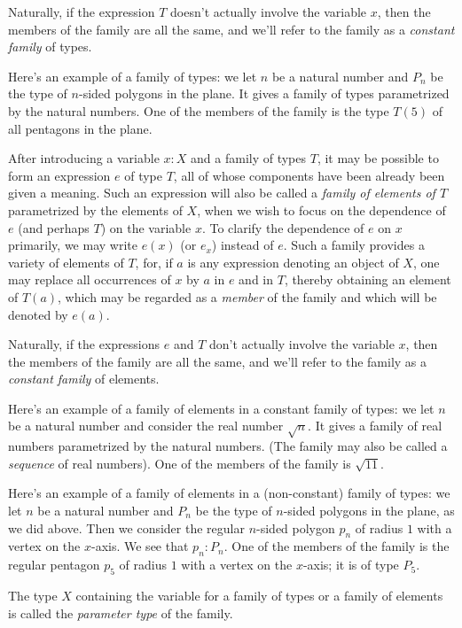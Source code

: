 Naturally, if the expression $T$ doesn't actually involve the variable $x$, then the members of the family are all the same,
and we'll refer to the family as a \emph{constant family} of types.

Here's an example of a family of types: we let $n$ be a natural number and $P_n$ be the type of $n$-sided polygons in the plane.  It gives a family
of types parametrized by the natural numbers.  One of the members of the family is the type $T(5)$ of all pentagons in the plane.

After introducing a variable $x:X$ and a family of types $T$, it may be possible to form an expression $e$ of type $T$, all of whose components have been already been
given a meaning.
Such an expression will also be called a \emph{family of elements of $T$}  parametrized by the elements of $X$, when
we wish to focus on the dependence of $e$ (and perhaps $T$) on the variable $x$.
To clarify the dependence of $e$ on $x$ primarily, we may write $e(x)$ (or $e_x$) instead of $e$.
Such a family provides a variety of elements of $T$, for, if $a$ is any expression denoting an object of $X$, one may replace all
occurrences of $x$ by $a$ in $e$ and in $T$, thereby obtaining an element of $T(a)$, which may be regarded as a \emph{member} of the family
and which will be denoted by $e(a)$.

Naturally, if the expressions $e$ and $T$ don't actually involve the variable $x$, then the members of the family are all the same,
and we'll refer to the family as a \emph{constant family} of elements.

Here's an example of a family of elements in a constant family of types: we let $n$ be a natural number and consider the real number $\sqrt n$.
It gives a family of real numbers parametrized by the natural numbers.
(The family may also be called a \emph{sequence} of real numbers).
One of the members of the family is $\sqrt{11}$.

Here's an example of a family of elements in a (non-constant) family of types: we let $n$ be a natural number and $P_n$ be the type of $n$-sided
polygons in the plane, as we did above.  Then we consider the regular $n$-sided polygon $p_n$ of radius $1$ with a vertex on the $x$-axis.  We
see that $p_n : P_n$.  One of the members of the family is the regular pentagon $p_5$ of radius $1$ with a vertex on the $x$-axis; it is of type
$P_5$.

The type $X$ containing the variable for a family of types or a family of elements is called the \emph{parameter type} of
the family. 

